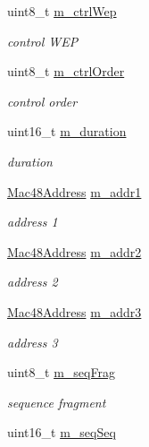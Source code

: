 \begin{DoxyCompactItemize}
uint8\+\_\+t \hyperlink{classns3_1_1WifiMacHeader_a7d9ce6ac9476424da6e06987f6782e2e}{m\+\_\+ctrl\+Wep}
\begin{DoxyCompactList}\small\item\em control W\+EP \end{DoxyCompactList}\item 
uint8\+\_\+t \hyperlink{classns3_1_1WifiMacHeader_a7363484f6b8f30e7ec2463150fdbed8f}{m\+\_\+ctrl\+Order}
\begin{DoxyCompactList}\small\item\em control order \end{DoxyCompactList}\item 
uint16\+\_\+t \hyperlink{classns3_1_1WifiMacHeader_a7adb3f465d0b7474cdceefc8ab993513}{m\+\_\+duration}
\begin{DoxyCompactList}\small\item\em duration \end{DoxyCompactList}\item 
\hyperlink{classns3_1_1Mac48Address}{Mac48\+Address} \hyperlink{classns3_1_1WifiMacHeader_a308c3d706ac2118142a76a261847629a}{m\+\_\+addr1}
\begin{DoxyCompactList}\small\item\em address 1 \end{DoxyCompactList}\item 
\hyperlink{classns3_1_1Mac48Address}{Mac48\+Address} \hyperlink{classns3_1_1WifiMacHeader_a6476ca1eb2261edf7914c97a71743f1d}{m\+\_\+addr2}
\begin{DoxyCompactList}\small\item\em address 2 \end{DoxyCompactList}\item 
\hyperlink{classns3_1_1Mac48Address}{Mac48\+Address} \hyperlink{classns3_1_1WifiMacHeader_adc7482e08ca2c700dce938d9d051bc43}{m\+\_\+addr3}
\begin{DoxyCompactList}\small\item\em address 3 \end{DoxyCompactList}\item 
uint8\+\_\+t \hyperlink{classns3_1_1WifiMacHeader_a9281a55cbfc7a2ba57ecbeeec56fae07}{m\+\_\+seq\+Frag}
\begin{DoxyCompactList}\small\item\em sequence fragment \end{DoxyCompactList}\item 
uint16\+\_\+t \hyperlink{classns3_1_1WifiMacHeader_a322d3a600f03f35b13e5e1f86b1b55e6}{m\+\_\+seq\+Seq}

\end{DoxyCompactItemize}
